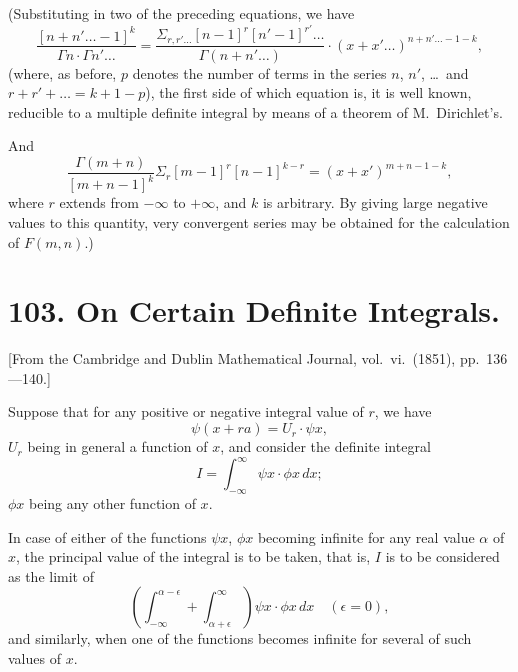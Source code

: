 \documentclass[11pt,a4paper]{article}
\theoremstyle{plain}
\begin{document}
(Substituting in two of the preceding equations, we have
\begin{equation}\frac{[n+n'\ldots-1]^k}{\Gamma n \cdot \Gamma n' \ldots} = \frac{\Sigma_{r,r'\ldots} [n-1]^r [n'-1]^{r'}\ldots}{\Gamma(n+n'\ldots)} \cdot (x+x'\ldots)^{n+n'\ldots-1-k},\tag{8}\end{equation}
(where, as before, $p$ denotes the number of terms in the series $n$, $n'$, \ldots\ and $r+r'+\ldots=k+1-p$), the first side of which equation is, it is well known, reducible to a multiple definite integral by means of a theorem of M.\ Dirichlet's.

And
\begin{equation}\frac{\Gamma(m+n)}{[m+n-1]^k} \Sigma_r [m-1]^r [n-1]^{k-r} = (x+x')^{m+n-1-k},\tag{9}\end{equation}
where $r$ extends from $-\infty$ to $+\infty$, and $k$ is arbitrary. By giving large negative values to this quantity, very convergent series may be obtained for the calculation of $F(m,n)$.)
\clearpage

\section*{103. On Certain Definite Integrals.}

[From the Cambridge and Dublin Mathematical Journal, vol.\ vi.\ (1851), pp.\ 136---140.]

Suppose that for any positive or negative integral value of $r$, we have
\[\psi(x + ra) = U_r \cdot \psi x,\]
$U_r$ being in general a function of $x$, and consider the definite integral
\[I = \int_{-\infty}^{\infty} \psi x \cdot \phi x \, dx;\]
$\phi x$ being any other function of $x$.

In case of either of the functions $\psi x$, $\phi x$ becoming infinite for any real value $\alpha$ of $x$, the principal value of the integral is to be taken, that is, $I$ is to be considered as the limit of
\[\left(\int_{-\infty}^{\alpha-\epsilon} + \int_{\alpha+\epsilon}^{\infty}\right) \psi x \cdot \phi x \, dx \quad (\epsilon = 0),\]
and similarly, when one of the functions becomes infinite for several of such values of $x$.
\end{document}

